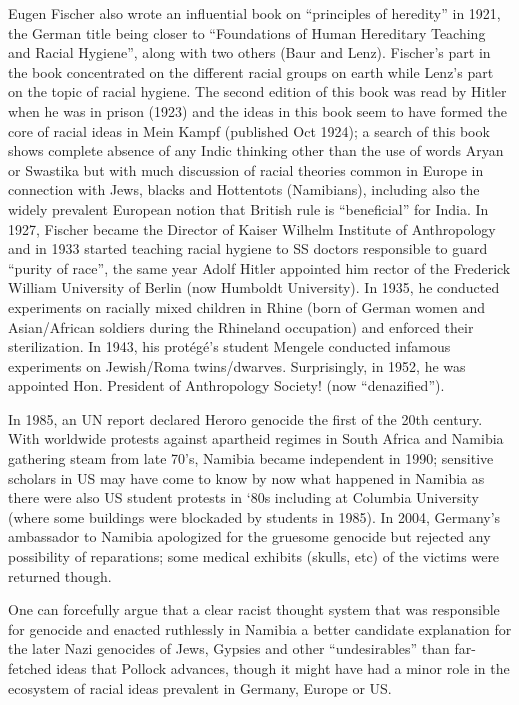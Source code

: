 Eugen Fischer also wrote an influential book on “principles of heredity” in 1921, the German title being closer to “Foundations of Human Hereditary Teaching and Racial Hygiene”, along with two others (Baur and Lenz).  Fischer’s part in the book concentrated on the different racial groups on earth while Lenz’s part on the topic of racial hygiene. The second edition of this book was read by Hitler when he was in prison (1923) and the ideas in this book seem to have formed the core of racial ideas in Mein Kampf (published Oct 1924); a search of this book shows complete absence of any Indic thinking other than the use of words Aryan or Swastika but with much  discussion of  racial theories common in Europe in connection with Jews, blacks and Hottentots (Namibians), including also the widely prevalent European notion that British rule is “beneficial” for India. In 1927, Fischer became the Director of Kaiser Wilhelm Institute of Anthropology and in 1933 started teaching racial hygiene to SS doctors responsible to guard “purity of race”, the same year Adolf Hitler appointed him rector of the Frederick William University of Berlin (now Humboldt University). In 1935, he conducted experiments on racially mixed children in Rhine (born of German women and Asian/African soldiers during the Rhineland occupation) and enforced their sterilization. In 1943, his protégé’s student Mengele conducted infamous experiments on Jewish/Roma twins/dwarves. Surprisingly, in 1952, he was appointed Hon. President of Anthropology Society! (now “denazified”).

In 1985, an UN report declared Heroro genocide the first of the 20th century. With worldwide protests against apartheid regimes in South Africa and Namibia gathering steam from late 70’s, Namibia became independent in 1990; sensitive scholars in US may have come to know by now what happened in Namibia as there were also US student protests in ‘80s including at Columbia University (where some buildings were blockaded by students in 1985). In 2004, Germany’s ambassador to Namibia apologized for the gruesome genocide but rejected any possibility of reparations; some medical exhibits (skulls, etc) of the victims were returned though.

One can forcefully argue that a clear racist thought system that was responsible for genocide and enacted ruthlessly in Namibia a better candidate explanation for the later Nazi genocides of  Jews, Gypsies and other “undesirables” than far-fetched ideas that Pollock advances, though it might have had a minor role in the ecosystem of racial ideas prevalent in Germany, Europe or US.

